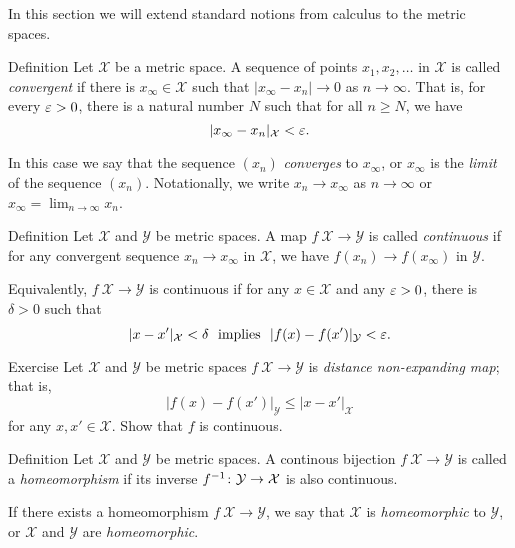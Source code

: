 In this section we will extend standard notions from calculus to the metric spaces.

\begin{thm}{Definition}
 Let ${\mathcal X}$ be a metric space.
A sequence of points $x_1, x_2, \ldots$ in ${\mathcal X}$ is called \emph{convergent}
if there is 
$x_\infty\in {\mathcal X}$ such that $|x_\infty -x_n|\to 0$ as $n\to\infty$.  
That is, for every $\varepsilon > 0$, there is a natural number $N$ such that for all $n \ge N$, we have
\[|x_\infty-x_n|_{\mathcal X} < \varepsilon.\]

In this case we say that the sequence $(x_n)$ \emph{converges} to $x_\infty$, 
or $x_\infty$ is the \emph{limit} of the sequence $(x_n)$.
Notationally, we write $x_n\to x_\infty$ as $n\to\infty$
or $x_\infty=\lim_{n\to\infty} x_n$.
\end{thm}

\begin{thm}{Definition}\label{def:continous}
Let ${\mathcal X}$ and ${\mathcal Y}$ be metric spaces.
A map $f\:{\mathcal X}\to {\mathcal Y}$ is called \emph{continuous} if for any convergent sequence $x_n\to x_\infty$ in ${\mathcal X}$,
we have $f(x_n) \to f(x_\infty)$ in ${\mathcal Y}$.

Equivalently, $f\:{\mathcal X}\to {\mathcal Y}$ is continuous if for any $x\in {\mathcal X}$ and any $\varepsilon>0$,
there is $\delta>0$ such that 
$$|x-x'|_{\mathcal X}<\delta\ \text{ implies }\ |f(x)-f(x')|_{\mathcal Y}<\eps.$$

\end{thm}

\begin{thm}{Exercise}\label{ex:shrt=>continuous}
Let ${\mathcal X}$ and ${\mathcal Y}$ be metric spaces $f\:{\mathcal X}\to {\mathcal Y}$ is \emph{distance non-expanding map}; that is, 
\[|f(x)-f(x')|_{\mathcal Y}\le |x-x'|_{\mathcal X}\]
for any $x,x'\in \mathcal X$.
Show that $f$ is continuous.
\end{thm}

\begin{thm}{Definition}
Let ${\mathcal X}$ and ${\mathcal Y}$ be metric spaces.
A continous bijection $f\:{\mathcal X}\to {\mathcal Y}$ 
is called a \emph{homeomorphism} 
if its inverse $f^{-1}\:{\mathcal Y}\z\to {\mathcal X}$ is also continuous.

If there exists a homeomorphism $f\:{\mathcal X}\to {\mathcal Y}$,
we say that ${\mathcal X}$ is \emph{homeomorphic} to ${\mathcal Y}$,
or  $\mathcal X$ and ${\mathcal Y}$ are \emph{homeomorphic}.
\end{thm}

